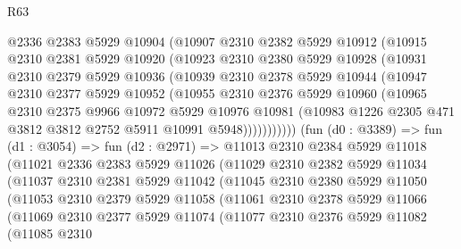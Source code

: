 \begin{lexlean}{R63}
\begin{coremodule}
            @2336
            @2383
            @5929
            @10904
            (@10907
              @2310
              @2382
              @5929
              @10912
              (@10915
                @2310
                @2381
                @5929
                @10920
                (@10923
                  @2310
                  @2380
                  @5929
                  @10928
                  (@10931
                    @2310
                    @2379
                    @5929
                    @10936
                    (@10939
                      @2310
                      @2378
                      @5929
                      @10944
                      (@10947
                        @2310
                        @2377
                        @5929
                        @10952
                        (@10955
                          @2310
                          @2376
                          @5929
                          @10960
                          (@10965
                            @2310
                            @2375
                            @9966
                            @10972
                            @5929
                            @10976
                            @10981
                            (@10983 @1226 @2305 @471 @3812 @3812 @2752 @5911 @10991 @5948)))))))))))
        (fun (d0 : @3389) =>
        fun (d1 : @3054) =>
        fun (d2 : @2971) =>
        @11013
          @2310
          @2384
          @5929
          @11018
          (@11021
            @2336
            @2383
            @5929
            @11026
            (@11029
              @2310
              @2382
              @5929
              @11034
              (@11037
                @2310
                @2381
                @5929
                @11042
                (@11045
                  @2310
                  @2380
                  @5929
                  @11050
                  (@11053
                    @2310
                    @2379
                    @5929
                    @11058
                    (@11061
                      @2310
                      @2378
                      @5929
                      @11066
                      (@11069
                        @2310
                        @2377
                        @5929
                        @11074
                        (@11077
                          @2310
                          @2376
                          @5929
                          @11082
                          (@11085
                            @2310

\end{coremodule}
\end{lexlean}
